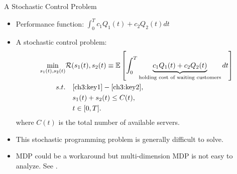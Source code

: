 \documentclass[smaller ,table,usenames,dvipsnames]{beamer}
\newcommand{\?}{\stackrel{?}{=}}
\begin{document}
\begin{frame}{A Stochastic Control Problem}
\begin{itemize}
    \item Performance function: $\int_{0}^{T}c_1Q_1(t) + c_2Q_2(t) dt $
	\item A stochastic control problem:
	\begin{align*}
	\min\limits_{s_1(t),s_2(t)}&\mathcal{R}(s_1(t),s_2(t) \equiv \mathbb{E}\left[\int_{0}^{T}\underbrace{ c_1Q_1(t) + c_2Q_2(t)  }_{\text{holding cost of waiting customers}}dt\right]\\
	s.t.&\quad \eqref{ch3:key1} - \eqref{ch3:key2},\\
	&\quad s_1(t)+s_2(t)\leq C(t),\\
	&\quad t\in[0,T].
	\end{align*}where $ C(t) $ is the total number of available servers.\medskip
	\item This stochastic programming problem is generally difficult to solve.
	\item MDP could be a workaround but multi-dimension MDP is not easy to analyze. See \cite{ahn2002optimal}.
\end{itemize}
\end{frame}
\end{document}
